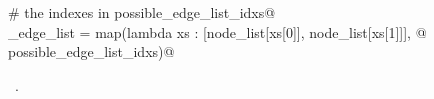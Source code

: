 \documentclass[11.5pt]{report}
\begin{document}
\begin{flushleft}
\begin{minipage}{\linewidth}
\begin{list}{}{}
\mbox{}\verb@# the indexes in possible_edge_list_idxs@\\
\mbox{}\verb@possible_edge_list = map(lambda xs : [node_list[xs[0]], node_list[xs[1]]], @\\
\mbox{}\verb@                         possible_edge_list_idxs)@\\
\mbox{}\verb@@{\NWsep}
\end{list}
\vspace{-1.5ex}
\footnotesize
\begin{list}{}{\setlength{\itemsep}{-\parsep}\setlength{\itemindent}{-\leftmargin}}
\item \NWtxtMacroRefIn\ .

\item{}
\end{list}
\end{minipage}\vspace{4ex}
\end{flushleft}
\end{document}
